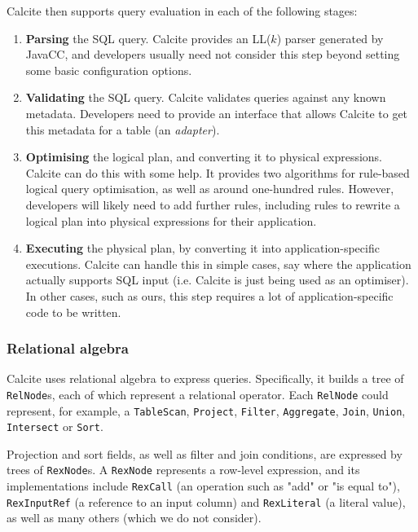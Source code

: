 Calcite then supports query evaluation in each of the following stages:
\begin{enumerate}
    \item \textbf{Parsing} the SQL query. Calcite provides an LL($k$) parser generated by JavaCC, and developers usually need not consider this step beyond setting some basic configuration options.
    \item \textbf{Validating} the SQL query. Calcite validates queries against any known metadata. Developers need to provide an interface that allows Calcite to get this metadata for a table (an \emph{adapter}).
    \item \textbf{Optimising} the logical plan, and converting it to physical expressions. Calcite can do this with some help. It provides two algorithms for rule-based logical query optimisation, as well as around one-hundred rules. However, developers will likely need to add further rules, including rules to rewrite a logical plan into physical expressions for their application.
    \item \textbf{Executing} the physical plan, by converting it into application-specific executions. Calcite can handle this in simple cases, say where the application actually supports SQL input (i.e. Calcite is just being used as an optimiser). In other cases, such as ours, this step requires a lot of application-specific code to be written.
\end{enumerate}

\subsubsection{Relational algebra}
\label{rel}

Calcite uses relational algebra \cite{Codd:1970:RMD:362384.362685} to express queries. Specifically, it builds a tree of \texttt{RelNode}s, each of which represent a relational operator. Each \texttt{RelNode} could represent, for example, a \texttt{TableScan}, \texttt{Project}, \texttt{Filter}, \texttt{Aggregate}, \texttt{Join}, \texttt{Union}, \texttt{Intersect} or \texttt{Sort}.

Projection and sort fields, as well as filter and join conditions, are expressed by trees of \texttt{RexNode}s. A \texttt{RexNode} represents a row-level expression, and its implementations include \texttt{RexCall} (an operation such as "add" or "is equal to"), \texttt{RexInputRef} (a reference to an input column) and \texttt{RexLiteral} (a literal value), as well as many others (which we do not consider).

